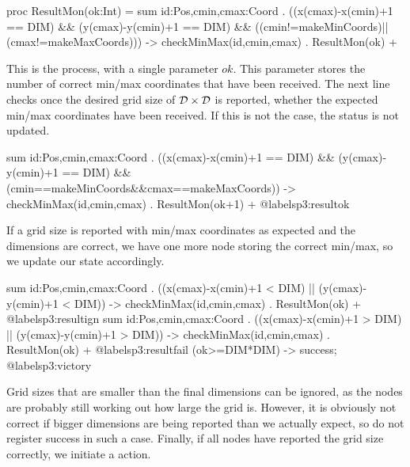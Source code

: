 \begin{codeverb}
proc    ResultMon(ok:Int) =
         sum id:Pos,cmin,cmax:Coord . ((x(cmax)-x(cmin)+1 == DIM) &&
                                       (y(cmax)-y(cmin)+1 == DIM) &&
                                       ((cmin!=makeMinCoords)||(cmax!=makeMaxCoords))) ->
                                      checkMinMax(id,cmin,cmax) .  ResultMon(ok) +
\end{codeverb}

This is the  process, with a single parameter $ok$. This parameter stores the number of correct min/max coordinates that have been received. The next line checks once the desired grid size of $\mathcal{D} \times \mathcal{D}$ is reported, whether the expected min/max coordinates have been received. If this is not the case, the status is not updated.

\begin{codeverb}
sum id:Pos,cmin,cmax:Coord . ((x(cmax)-x(cmin)+1 == DIM) &&
                              (y(cmax)-y(cmin)+1 == DIM) &&
                              (cmin==makeMinCoords&&cmax==makeMaxCoords)) ->
                             checkMinMax(id,cmin,cmax) .  ResultMon(ok+1) + @label{sp3:resultok}
\end{codeverb}

If a grid size is reported with min/max coordinates as expected and the dimensions are correct, we have one more node storing the correct min/max, so we update our state accordingly.

\begin{codeverb}
sum id:Pos,cmin,cmax:Coord . ((x(cmax)-x(cmin)+1 <  DIM) ||
                              (y(cmax)-y(cmin)+1 <  DIM)) -> 
                             checkMinMax(id,cmin,cmax) . ResultMon(ok) + @label{sp3:resultign}
sum id:Pos,cmin,cmax:Coord . ((x(cmax)-x(cmin)+1 >  DIM) ||
                              (y(cmax)-y(cmin)+1 >  DIM)) ->
                             checkMinMax(id,cmin,cmax) . ResultMon(ok) + @label{sp3:resultfail}
(ok>=DIM*DIM) -> success; @label{sp3:victory}
\end{codeverb}

Grid sizes that are smaller than the final dimensions can be ignored, as the nodes are probably still working out how large the grid is. However, it is obviously not correct if bigger dimensions are being reported than we actually expect, so do not register success in such a case. Finally, if all nodes have reported the grid size correctly, we initiate a  action.

